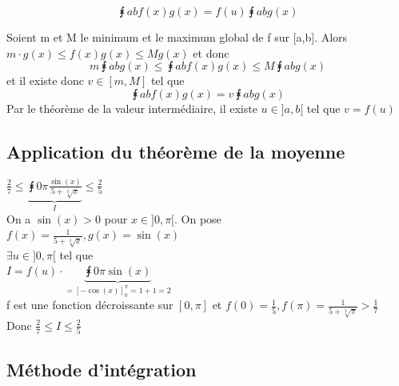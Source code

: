 \documentclass[12pt,a4paper]{article}
\begin{document}
{\begin{boite}
\begin{equation}
	\intx{a}{b}{f(x)g(x)} = f(u)\intx{a}{b}{g(x)}
\end{equation}
\end{boite}
Soient m et M le minimum et le maximum global de f sur [a,b]. Alors $m\cdot g(x) \leq f(x)g(x) \leq Mg(x)$ et donc
\begin{equation}
	m\intx{a}{b}{g(x)} \leq \intx{a}{b}{f(x)g(x)} \leq M\intx{a}{b}{g(x)}
\end{equation}
et il existe donc $v \in [m,M]$ tel que 
\begin{equation}
	\intx{a}{b}{f(x)g(x)} = v\intx{a}{b}{g(x)}
\end{equation}
Par le théorème de la valeur intermédiaire, il existe $u \in]a,b[$ tel que $v = f(u)$
\newpage
\subsection{Application du théorème de la moyenne}
 $\frac{2}{7	} \leq \underbrace{\intx{0}{\pi}{\frac{\sin(x)}{5+\sqrt[3]{x}}}}_I \leq \frac{2}{5}$\\
 On a $\sin(x) > 0$ pour $x \in ]0,\pi[$. On pose \\
$f(x) = \frac{1}{5+\sqrt[3]{x}}, g(x) = \sin(x)$\\
$\exists u \in ]0,\pi[$ tel que \\
$I= f(u) \cdot \underbrace{\intx{0}{\pi}{\sin(x)}}_{= [-\cos(x)]_0^\pi = 1+1 = 2}$\\
f est une fonction décroissante sur $[0,\pi]$ et $f(0) = \frac{1}{5}, f(\pi) = \frac{1}{5+\sqrt[3]{\pi}} > \frac{1}{7}$\\
Donc $\frac{2}{7} \leq I \leq \frac{2}{5}$
\subsection{Méthode d'intégration}
}
\end{document}
